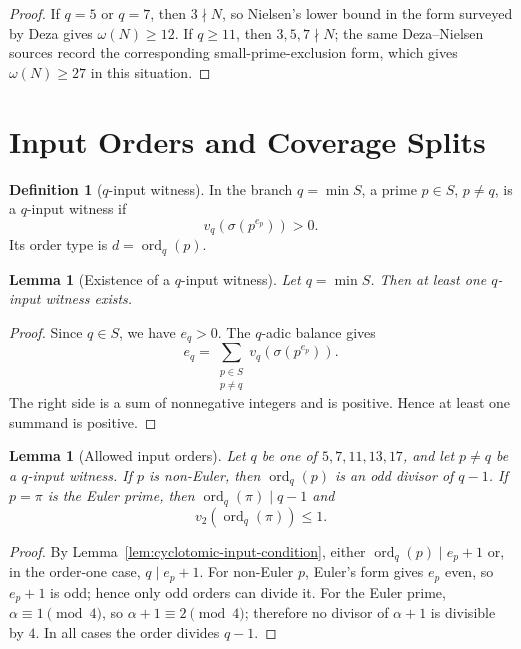 \documentclass[11pt]{article}
\newtheorem{lemma}[theorem]{Lemma}
\theoremstyle{definition}
\newtheorem{definition}[theorem]{Definition}
\theoremstyle{remark}
\DeclareMathOperator{\ord}{ord}
\begin{document}
\begin{proof}
If \(q=5\) or \(q=7\), then \(3\nmid N\), so Nielsen's lower bound in the
form surveyed by Deza \cite{Deza2022,Nielsen2007} gives
\(\omega(N)\ge12\).  If \(q\ge11\), then \(3,5,7\nmid N\); the same
Deza--Nielsen sources record the corresponding small-prime-exclusion form,
which gives \(\omega(N)\ge27\) in this situation.
\end{proof}

\section{Input Orders and Coverage Splits}
\label{sec:coverage}

\begin{definition}[\(q\)-input witness]
In the branch \(q=\min S\), a prime \(p\in S\), \(p\ne q\), is a
\(q\)-input witness if
\[
  v_q(\sigma(p^{e_p}))>0.
\]
Its order type is \(d=\ord_q(p)\).
\end{definition}

\begin{lemma}[Existence of a \(q\)-input witness]
\label{lem:q-input-exists}
Let \(q=\min S\).  Then at least one \(q\)-input witness exists.
\end{lemma}

\begin{proof}
Since \(q\in S\), we have \(e_q>0\).  The \(q\)-adic balance gives
\[
  e_q=\sum_{\substack{p\in S\\p\ne q}}v_q(\sigma(p^{e_p})).
\]
The right side is a sum of nonnegative integers and is positive.  Hence at
least one summand is positive.
\end{proof}

\begin{lemma}[Allowed input orders]
\label{lem:allowed-input-orders}
Let \(q\) be one of \(5,7,11,13,17\), and let \(p\ne q\) be a \(q\)-input
witness.  If \(p\) is non-Euler, then \(\ord_q(p)\) is an odd divisor of
\(q-1\).  If \(p=\pi\) is the Euler prime, then \(\ord_q(\pi)\mid q-1\) and
\[
  v_2(\ord_q(\pi))\le1.
\]
\end{lemma}

\begin{proof}
By Lemma~\ref{lem:cyclotomic-input-condition}, either \(\ord_q(p)\mid e_p+1\)
or, in the order-one case, \(q\mid e_p+1\).  For non-Euler \(p\), Euler's form
gives \(e_p\) even, so \(e_p+1\) is odd; hence only odd orders can divide it.
For the Euler prime, \(\alpha\equiv1\pmod4\), so \(\alpha+1\equiv2\pmod4\);
therefore no divisor of \(\alpha+1\) is divisible by \(4\).  In all cases the
order divides \(q-1\).
\end{proof}
\end{document}

